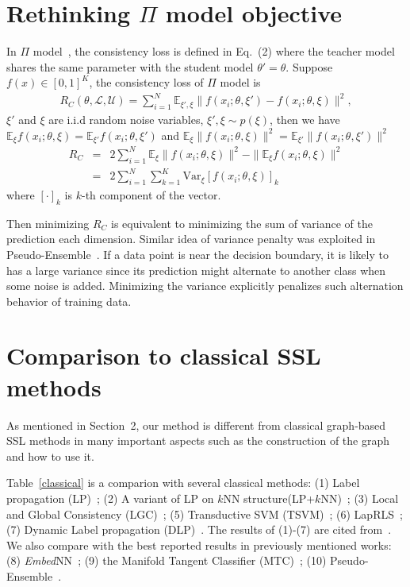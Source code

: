 \documentclass[10pt,twocolumn,letterpaper]{article}
\begin{document}
\section{Rethinking $\Pi$ model objective}
\label{app:rethink}
In $\Pi$ model~\cite{laine2016temporal}, the consistency loss is defined in Eq.~({\color{red}2}) %
where the teacher model shares the same parameter with the student model $\theta' = \theta$. Suppose $f(x)\in [0,1]^K$, the consistency loss of $\Pi$ model is
\begin{eqnarray*}
	R_C(\theta, \mathcal{L}, \mathcal{U}) = \sum_{i=1}^{N}\mathbb{E}_{\xi',\xi}\|  f(x_i;\theta, \xi') - f(x_i;\theta, \xi)\|^2 ,
\end{eqnarray*}
$\xi'$ and $\xi$ are i.i.d random noise variables, $\xi',\xi \sim p(\xi)$, then we have $\mathbb{E}_\xi f(x_i;\theta,\xi) = \mathbb{E}_{\xi'} f(x_i;\theta,\xi')$ and $\mathbb{E}_\xi \|f(x_i;\theta,\xi)\|^2 = \mathbb{E}_{\xi'} \|f(x_i;\theta,\xi')\|^2$
\begin{eqnarray*}
	R_C \!\!&\!=\!&\!\! 2\sum_{i=1}^{N}\mathbb{E}_{\xi}\|f(x_i; \theta, \xi)\|^2 -\| \mathbb{E}_{\xi}f(x_i;\theta, \xi)\|^2\\
	\!\!&\!=\!&\!\! 2\sum_{i=1}^{N}\sum_{k=1}^{K}\mathrm{Var}_{\xi}\left[f(x_i;\theta, \xi)\right]_k
\end{eqnarray*}
where $[\cdot]_k$ is $k$-th component of the vector.

Then minimizing $R_C$ is equivalent to minimizing the sum of variance of the prediction each dimension. Similar idea of variance penalty was exploited in Pseudo-Ensemble~\cite{bachman2014learning}. If a data point is near the decision boundary, it is likely to has a large variance since its prediction might alternate to another class when some noise is added. Minimizing the variance explicitly penalizes such alternation behavior of training data.



\section{Comparison to classical SSL methods}
As mentioned in Section~{\color{red}2}, our method is different from classical graph-based SSL methods in many important aspects such as the construction of the graph and how to use it.

Table~\ref{classical} is a comparion with several classical methods: (1) Label propagation (LP)~\cite{zhu2002learning}; (2) A variant of LP on $k$NN structure(LP+$k$NN)~\cite{subramanya2010efficient}; (3) Local and Global Consistency (LGC)~\cite{zhou2004learning}; (5) Transductive SVM (TSVM)~\cite{joachims1999transductive}; (6) LapRLS~\cite{belkin2006manifold}; (7) Dynamic Label propagation (DLP)~\cite{wang2013dynamic}. The results of (1)-(7) are cited from~\cite{wang2013dynamic}. We also compare with the best reported results in previously mentioned works: (8) \emph{Embed}NN~\cite{weston2008deep}; (9) the Manifold Tangent Classifier (MTC)~\cite{rifai2011manifold}; (10) Pseudo-Ensemble~\cite{bachman2014learning}.
\end{document}
